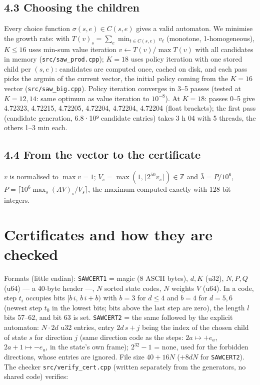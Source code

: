 \documentclass[11pt,a4paper]{report}
\begin{document}
\subsection{4.3 Choosing the children}

Every choice function \(\sigma(s,e)\in C(s,e)\) gives a valid automaton. We minimise the growth rate: with
\(T(v)_s=\sum_e\min_{t\in C(s,e)}v_t\) (monotone, 1-homogeneous), \(K\le16\) uses min-sum value iteration
\(v\leftarrow T(v)/\max T(v)\) with all candidates in memory (\texttt{src/saw\_prod.cpp}); \(K=18\) uses policy iteration
with one stored child per \((s,e)\): candidates are computed once, cached on disk, and each pass picks the argmin
of the current vector, the initial policy coming from the \(K=16\) vector (\texttt{src/saw\_big.cpp}). Policy iteration
converges in 3--5 passes (tested at \(K=12,14\): same optimum as value iteration to \(10^{-8}\)). At \(K=18\): passes 0--5
give 4.72323, 4.72215, 4.72205, 4.72204, 4.72204, 4.72204 (float brackets); the first pass (candidate generation,
6.8·10⁹ candidate entries) takes 3 h 04 with 5 threads, the others 1--3 min each.

\subsection{4.4 From the vector to the certificate}

\(v\) is normalised to \(\max v=1\); \(V_s=\max(1,\lceil 2^{50}v_s\rceil)\in\mathbb Z\) and \(\bar\lambda=P/10^6\),
\(P=\lceil10^6\max_s (AV)_s/V_s\rceil\), the maximum computed exactly with 128-bit integers.

\section{Certificates and how they are checked}

Formats (little endian): \texttt{SAWCERT1} = magic (8 ASCII bytes), \(d,K\) (u32), \(N,P,Q\) (u64) --- a 40-byte
header ---, \(N\) sorted state codes, \(N\) weights \(V\) (u64). In a code, step \(t_i\) occupies bits
\([b\,i,\,b\,i+b)\) with \(b=3\) for \(d\le4\) and \(b=4\) for \(d=5,6\) (newest step \(t_0\) in the lowest bits; bits
above the last step are zero), the length \(l\) bits 57--62, and bit 63 is set. \texttt{SAWCERT2} = the same followed
by the explicit automaton: \(N\cdot2d\) u32 entries, entry \(2d\,s+j\) being the index of the chosen child of state \(s\)
for direction \(j\) (same direction code as the steps: \(2a\mapsto+e_a\), \(2a+1\mapsto-e_a\), in the state's own
frame); \(2^{32}-1\) = none, used for the forbidden directions, whose entries are ignored. File size \(40+16N\)
(\(+8dN\) for \texttt{SAWCERT2}). The checker \texttt{src/verify\_cert.cpp} (written separately from the generators, no
shared code) verifies:
\end{document}

